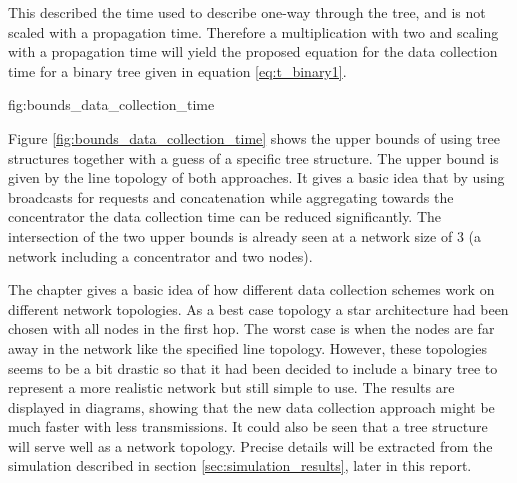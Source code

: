 This described the time used to describe one-way through the tree, and is not scaled with a propagation time. Therefore a multiplication with two and scaling with a propagation time will yield the proposed equation for the data collection time for a binary tree given in equation \ref{eq:t_binary1}.

 {fig:bounds_data_collection_time}

Figure \ref{fig:bounds_data_collection_time} shows the upper bounds of using tree structures together with a guess of a specific tree structure. The upper bound is given by the line topology of both approaches. It gives a basic idea that by using broadcasts for requests and concatenation while aggregating towards the concentrator the data collection time can be reduced significantly. The intersection of the two upper bounds is already seen at a network size of 3 (a network including a concentrator and two nodes).

The chapter gives a basic idea of how different data collection schemes work on different network topologies. As a best case topology a star architecture had been chosen with all nodes in the first hop. The worst case is when the nodes are far away in the network like the specified line topology. However, these topologies seems to be a bit drastic so that it had been decided to include a binary tree to represent a more realistic network but still simple to use. The results are displayed in diagrams, showing that the new data collection approach might be much faster with less transmissions. It could also be seen that a tree structure will serve well as a network topology. Precise details will be extracted from the simulation described in section \ref{sec:simulation_results}, later in this report.

%



